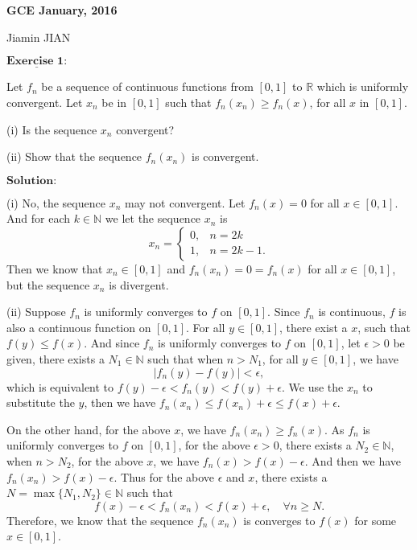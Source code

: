\documentclass[12pt,a4paper]{ctexart}
\begin{document}
\begin{center}
\textbf{ GCE January, 2016}
\vspace{8pt}

Jiamin JIAN
\end{center}

\vspace{12pt}

$\underline{\textbf{Exercise 1:}}$

Let $f_{n}$ be a sequence of continuous functions from $[0, 1]$ to $\mathbb{R}$ which is uniformly convergent. Let $x_{n}$ be in $[0, 1]$ such that $f_{n}(x_{n}) \geq f_{n}(x)$, for all $x$ in $[0, 1]$.

(i) Is the sequence $x_{n}$ convergent?

(ii) Show that the sequence $f_{n}(x_{n})$ is convergent.

\vspace{8pt}

$\textbf{Solution:}$

(i) No, the sequence $x_{n}$ may not convergent. Let $f_{n} (x) = 0$ for all $x \in [0, 1]$. And for each $k \in \mathbb{N}$ we let the sequence $x_{n}$ is
\begin{equation*}
x_{n} =
\left\{
             \begin{array}{cl}
             0, & n = 2k \\
             1, & n = 2k -1.
             \end{array}
\right.
\end{equation*}
Then we know that $x_{n} \in [0, 1]$ and $f_{n}(x_{n}) = 0 = f_{n}(x)$ for all $x \in [0, 1]$, but the sequence $x_{n}$ is divergent.

(ii) Suppose $f_{n}$ is uniformly converges to $f$ on $[0, 1]$. Since $f_{n}$ is continuous, $f$ is also a continuous function on $[0,1]$. For all $y \in [0, 1]$, there exist a $x$, such that $f(y) \leq f(x)$. And since $f_{n}$ is uniformly converges to $f$ on $[0, 1]$, let $\epsilon > 0$ be given, there exists a $N_{1} \in \mathbb{N}$ such that when $n > N_{1}$, for all $y \in [0, 1]$, we have
\begin{equation*}
    |f_{n}(y) - f(y)| < \epsilon,
\end{equation*}
which is equivalent to $f(y) - \epsilon < f_{n}(y) < f(y) + \epsilon$. We use the $x_{n}$ to substitute the $y$, then we have $f_{n}(x_{n}) \leq f(x_{n}) + \epsilon \leq f(x) + \epsilon$. 

On the other hand, for the above $x$, we have $f_{n}(x_{n}) \geq f_{n}(x)$. As $f_{n}$ is uniformly converges to $f$ on $[0, 1]$, for the above $\epsilon > 0$, there exists a $N_{2} \in \mathbb{N}$, when $n > N_{2}$, for the above $x$, we have $f_{n}(x) > f(x) - \epsilon$. And then we have $f_{n}(x_{n}) > f(x) - \epsilon$. Thus for the above $\epsilon$ and $x$, there exists a $N = \max \{N_1, N_2\} \in \mathbb N$ such that
\begin{equation*}
    f(x) - \epsilon < f_{n}(x_{n}) < f(x) + \epsilon, \quad \forall n \geq N.
\end{equation*}
Therefore, we know that the sequence $f_{n}(x_{n})$ is converges to $f(x)$ for some $x \in [0,1]$.
\end{document}
